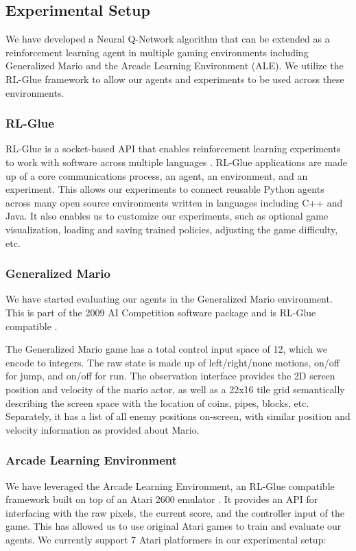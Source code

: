 \documentclass{article}
\begin{document}
\subsection{Experimental Setup}

We have developed a Neural Q-Network algorithm that can be extended as a reinforcement learning agent in multiple gaming environments including Generalized Mario and the Arcade Learning Environment (ALE). We utilize the RL-Glue framework to allow our agents and experiments to be used across these environments.

\subsubsection{RL-Glue}
RL-Glue is a socket-based API that enables reinforcement learning experiments to work with software across multiple languages \cite{Tanner09}. RL-Glue applications are made up of a core communications process, an agent, an environment, and an experiment. This allows our experiments to connect reusable Python agents across many open source environments written in languages including C++ and Java. It also enables us to customize our experiments, such as optional game visualization, loading and saving trained policies, adjusting the game difficulty, etc.

\subsubsection{Generalized Mario}
We have started evaluating our agents in the Generalized Mario environment. This is part of the 2009 AI Competition software package and is RL-Glue compatible \cite{Togelius10}.

The Generalized Mario game has a total control input space of 12, which we encode to integers. The raw state is made up of left/right/none motions, on/off for jump, and on/off for run. The observation interface provides the 2D screen position and velocity of the mario actor, as well as a 22x16 tile grid semantically describing the screen space with the location of coins, pipes, blocks, etc. Separately, it has a list of all enemy positions on-screen, with similar position and velocity information as provided about Mario. 

\subsubsection{Arcade Learning Environment}
We have leveraged the Arcade Learning Environment, an RL-Glue compatible framework built on top of an Atari 2600 emulator \cite{bellemare13}.  It provides an API for interfacing with the raw pixels, the current score, and the controller input of the game. This has allowed us to use original Atari games to train and evaluate our agents. We currently support 7 Atari platformers in our experimental setup:
\end{document}

